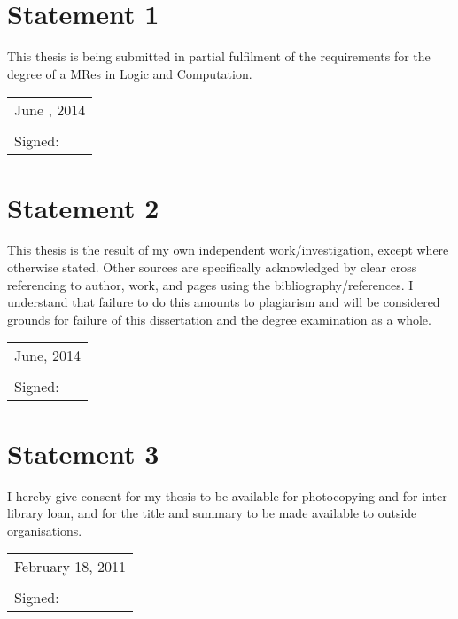 \documentclass[11pt, a4paper, twoside, openright]{book}
\begin{document}
\section*{Statement 1}
This thesis is being submitted in partial fulfilment of the
requirements for the degree of a MRes in Logic and Computation.

\vspace{0.5cm}
\begin{tabular}{l}
June , 2014\\
\\
Signed:
\end{tabular}

\section*{Statement 2}

This thesis is the result of my own independent
work/investigation, except where otherwise stated. Other sources are
specifically acknowledged by clear cross referencing to author, work,
and pages using the bibliography/references. I understand that failure
to do this amounts to plagiarism and will be considered grounds for
failure of this dissertation and the degree examination as a whole.

\vspace{0.5cm}
\begin{tabular}{l}
June, 2014\\
\\
Signed:
\end{tabular}

\section*{Statement 3}

I hereby give consent for my thesis to be available for
photocopying and for inter-library loan, and for the title and summary
to be made available to outside organisations.

\vspace{0.5cm}
\begin{tabular}{l}
February 18, 2011\\
\\
Signed:
\end{tabular}

\clearpage
\thispagestyle{empty}
\mbox{}

\newpage

\tableofcontents


\clearpage




















\end{document}
